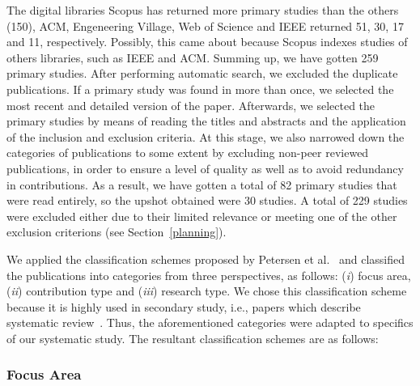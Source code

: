 The digital libraries Scopus has returned more primary studies than the others (150), ACM, Engeneering Village, Web of Science and IEEE returned 51, 30, 17 and 11, respectively. Possibly, this came about because Scopus indexes studies of others libraries, such as IEEE and ACM. Summing up, we have gotten 259 primary studies. After performing automatic search, we excluded the duplicate publications. If a primary study was found in more than once, we selected the most recent and detailed version of the paper. Afterwards, we selected the primary studies by means of reading the titles and abstracts and the application of the inclusion and exclusion criteria. At this stage, we also narrowed down the categories of publications to some extent by excluding non-peer reviewed publications, in order to ensure a level of quality as well as to avoid redundancy in contributions. As a result, we have gotten a total of 82 primary studies that were read entirely, so the upshot obtained were 30 studies. A total of 229 studies were excluded either due to their limited relevance or meeting one of the other exclusion criterions (see Section~\ref{planning}).

We applied the classification schemes proposed by Petersen et al.~\cite{Petersen:2008:SMS:2227115.2227123} and classified the publications into categories from three perspectives, as follows: (\textit{i}) focus area, (\textit{ii}) contribution type and (\textit{iii}) research type. We chose this classification scheme because it is highly used in secondary study, i.e., papers which describe systematic review~\cite{Durelli:2013:SRM:2480362.2480567}.%
Thus, the aforementioned categories were adapted to specifics of our systematic study. The resultant classification schemes are as follows:

\subsubsection{Focus Area}

